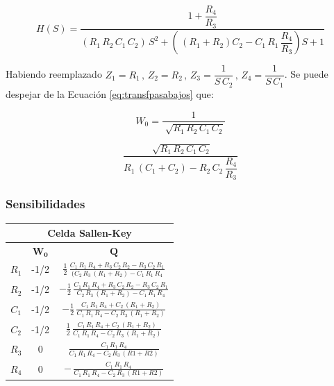 \begin{equation} 
	H(S) = \dfrac{1+ \dfrac{R_4}{R_3}}{\left(R_1 \, R_2 \, C_1 \, C_2 \right) \, S^2 + \left( \, \left(R_1 + R_2 \right) C_2 - C_1 \, R_1 \, \dfrac{R_4}{R_3} \right) S +1}	
	\label{eq:transfpasabajos}
\end{equation}
	
	Habiendo reemplazado $Z_1 = R_1 \, , \, Z_2 = R_2 \, , \, Z_3 = \dfrac{1}{S \, C_2} \, , \, Z_4 = \dfrac{1}{S \, C_1}$. 
	Se puede despejar de la Ecuación \ref{eq:transfpasabajos} que:

\begin{equation}
W_0 = \dfrac{1}{\sqrt[]{R_1 \, R_2 \, C_1 \, C_2}}
	\label{eq:freqdecorte}
\end{equation}	

\begin{equation}
\dfrac{\sqrt[]{R_1 \, R_2 \, C_1 \, C_2}}{R_1 \, (C_1 + C_2) - R_2 \, C_2 \, \dfrac{R_4}{R_3}}
	\label{eq:Q}
\end{equation}

\subsubsection{Sensibilidades}


\begin{table}[H]
\centering
\begin{tabular}{|c|c|c|}
\hline
\multicolumn{3}{|c|}{\textbf{Celda Sallen-Key}} 	\\ \hline
               & $\mathbf{W_0}$  & $\mathbf{Q}$   	\\ \hline
$R_1$             & -1/2           & $\frac{1}{2} \, \frac{C_1 
\, R_1 \, R_4 + R_3 \, C_2 \, R_2 - R_3 \, C_2 \, R_1}{(C_2 \, R_3 \, (R_1+R_2)- C_1 \, R_1 \, R_4}$            \\ \hline
$R_2$             & -1/2            & $- \frac{1}{2} \, \frac{C_1 
\, R_1 \, R_4 + R_3 \, C_2 \, R_2 - R_3 \, C_2 \, R_1}{C_2 \, R_3 \, (R_1+R_2)- C_1 \, R_1 \, R_4}$            \\ \hline
$C_1$             & -1/2            & $- \frac{1}{2} \, \frac{C_1 \, R_1 \, R_4 + C_2 \, (R_1+R_2)}{C_1 \, R_1 \, R_4 - C_2 \, R_3 \,(R_1+R_2)}$            	\\ \hline
$C_2$             & -1/2            & $\frac{1}{2} \, \frac{C_1 \, R_1 \, R_4 + C_2 \, (R_1+R_2)}{C_1 \, R_1 \, R_4 - C_2 \, R_3 \,(R_1+R_2)}$            	\\ \hline
$R_3$             & 0               & $\frac{C_1 \, R_1 \, R_4}{C_1 \, R_1 \, R_4 - C_2 \, R_3 \, (R1+R2)}$            \\ \hline
$R_4$             & 0               & $- \, \frac{C_1 \, R_1 \, R_4}{C_1 \, R_1 \, R_4 - C_2 \, R_3 \, (R1+R2)}$            \\ \hline
\end{tabular}
\end{table}

